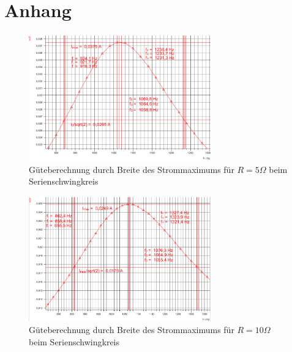 \documentclass[12pt,a4paper]{article}
\begin{document}
\section{Anhang}
\begin{figure}[H]
	\centering
	\includegraphics[width=0.7\textwidth]{Daten/S5Ohm_f0.png}
	\caption{Güteberechnung durch Breite des Strommaximums für $R=5\Omega$ beim Serienschwingkreis}
\end{figure}
\begin{figure}[H]
	\centering
	\includegraphics[width=0.7\textwidth]{Daten/S10Ohm_f0.png}
	\caption{Güteberechnung durch Breite des Strommaximums für $R=10\Omega$ beim Serienschwingkreis}
\end{figure}
\end{document}
